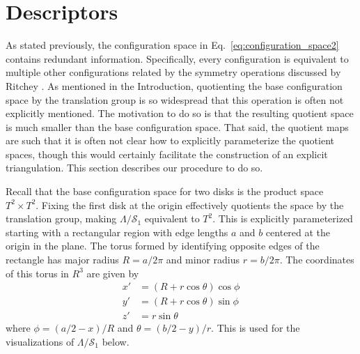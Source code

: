 \documentclass[default,iicol]{sn-jnl}%
\theoremstyle{thmstyleone}%
\theoremstyle{thmstyletwo}%
\theoremstyle{thmstylethree}%
\begin{document}
\section{Descriptors}
\label{sec:descriptors}

As stated previously, the configuration space in Eq.\ \ref{eq:configuration_space2} contains redundant information. Specifically, every configuration is equivalent to multiple other configurations related by the symmetry operations discussed by Ritchey \cite{ritcheyphd}. As mentioned in the Introduction, quotienting the base configuration space by the translation group is so widespread that this operation is often not explicitly mentioned. The motivation to do so is that the resulting quotient space is much smaller than the base configuration space. That said, the quotient maps are such that it is often not clear how to explicitly parameterize the quotient spaces, though this would certainly facilitate the construction of an explicit triangulation. This section describes our procedure to do so.

Recall that the base configuration space for two disks is the product space $T^2 \times T^2$. Fixing the first disk at the origin effectively quotients the space by the translation group, making $\Lambda/\mathcal{S}_1$ equivalent to $T^2$. This is explicitly parameterized starting with a rectangular region with edge lengths $a$ and $b$ centered at the origin in the plane. The torus formed by identifying opposite edges of the rectangle has major radius $R = a / 2 \pi$ and minor radius $r = b / 2 \pi$. The coordinates of this torus in $R^3$ are given by
\begin{align*}
	x' &=  (R + r \cos\theta) \cos\phi \nonumber \\
	y' &= (R + r \cos\theta) \sin\phi \nonumber \\
	z' &= r \sin\theta  \label{eq:torus_mapping}
\end{align*}
where $\phi = (a / 2 - x) / R$ and $\theta = (b / 2 - y) / r$. This is used for the visualizations of $\Lambda/\mathcal{S}_1$ below.
\end{document}
